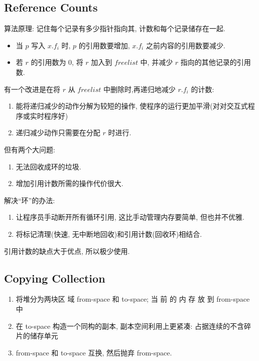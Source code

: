 \subsection{Reference Counts}
算法原理: 记住每个记录有多少指针指向其, 计数和每个记录储存在一起. 

\begin{itemize}
    \item 当 $p$ 写入 $x.f_i$ 时, $p$ 的引用数要增加, $x.f_i$ 之前内容的引用数要减少. 
    \item 若 $r$ 的引用数为 0, 将 $r$ 加入到 $freelist$ 中, 并减少 $r$ 指向的其他记录的引用数. 
\end{itemize}

有一个改进是在将 $r$ 从 $freelist$ 中删除时,再递归地减少 $r.f_i$ 的计数:
\begin{enumerate}
    \item 能将递归减少的动作分解为较短的操作, 使程序的运行更加平滑(对对交互式程序或实时程序好)
    \item 递归减少动作只需要在分配 $r$ 时进行. 
\end{enumerate}

但有两个大问题:
\begin{enumerate}
    \item 无法回收成环的垃圾.
    \item 增加引用计数所需的操作代价很大.
\end{enumerate}

解决``环''的办法:
\begin{enumerate}
    \item 让程序员手动断开所有循环引用, 这比手动管理内存要简单, 但也并不优雅.
    \item 将标记清理(快速, 无中断地回收)和引用计数(回收环)相结合.
\end{enumerate}

引用计数的缺点大于优点, 所以极少使用. 

\subsection{Copying Collection}
\begin{enumerate}
    \item 将堆分为两块区 域 from-space 和 to-space; 当 前 的 内 存 放 到 from-space 中 
    \item 在 to-space 构造一个同构的副本, 副本空间利用上更紧凑: 占据连续的不含碎片的储存单元
    \item from-space 和 to-space 互换, 然后抛弃 from-space. 
\end{enumerate}



